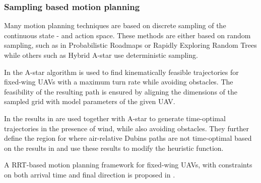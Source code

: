 \subsubsection{Sampling based motion planning}
Many motion planning techniques are based on discrete sampling of the continuous state - and action space. These methods are either based on 
random sampling, such as in Probabilistic Roadmaps \cite{prm} or Rapidly Exploring Random Trees \cite{rrt} while others such as Hybrid A-star \cite{hybrid_astar} use 
deterministic sampling.

In \cite{2_phase_uav} the A-star algorithm \cite{astar} is used to find kinematically feasible trajectories for fixed-wing UAVs with 
a maximum turn rate while avoiding obstacles. The feasibility of the resulting path is ensured by aligning the dimensions of the 
sampled grid with model parameters of the given UAV.

In \cite{wind_astar} the results in \cite{optimal_path_trochoidal} are used together with A-star to generate time-optimal trajectories in the 
presence of wind, while also avoiding obstacles. They further define the region for where air-relative Dubins paths are not time-optimal 
based on the results in \cite{optimal_path_target} and use these results to modify the heuristic function.

A RRT-based motion planning framework for fixed-wing UAVs, with constraints on both arrival time and final direction is proposed in \cite{rrt_uav}.


